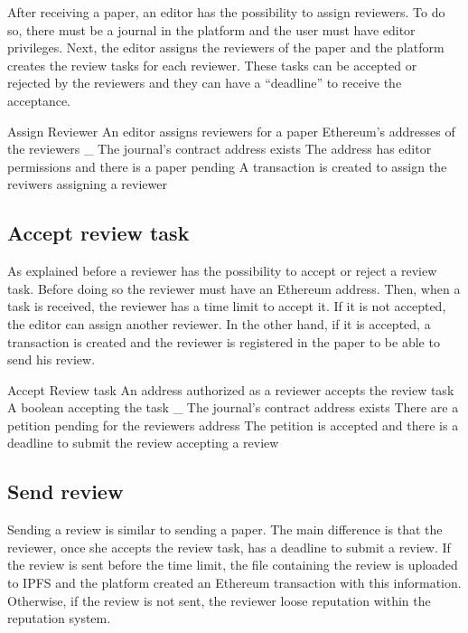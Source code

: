 After receiving a paper, an editor has the possibility to assign reviewers. To
do so, there must be a journal in the platform and the user must have editor
privileges. Next, the editor assigns the reviewers of the paper and the platform
creates the review tasks for each reviewer. These tasks can be accepted or
rejected by the reviewers and they can have a ``deadline'' to receive the
acceptance.

{Assign Reviewer}%
{An editor assigns reviewers for a paper}%
{Ethereum's addresses of the reviewers}%
{_}%
{The journal's contract address exists} {The address has editor permissions and
  there is a paper pending}%
{A transaction is created to assign the reviwers}%
{assigning a reviewer}%

\subsection*{Accept review task}

As explained before a reviewer has the possibility to accept or reject a review
task. Before doing so the reviewer must have an Ethereum address. Then, when a
task is received, the reviewer has a time limit to accept it. If it is not
accepted, the editor can assign another reviewer. In the other hand, if it is
accepted, a transaction is created and the reviewer is registered in the paper
to be able to send his review.

{Accept Review task}%
{An address authorized as a reviewer accepts the review
  task}%
{A boolean accepting the task}%
{_}%
{The journal's contract address exists}%
{There are a petition pending for the reviewers address}%
{The petition is accepted and there is a deadline to submit the
  review}%
{accepting a review}%

\subsection*{Send review}

Sending a review is similar to sending a paper. The main difference is that the
reviewer, once she accepts the review task, has a deadline to submit a review.
If the review is sent before the time limit, the file containing the review is
uploaded to IPFS and the platform created an Ethereum transaction with this
information. Otherwise, if the review is not sent, the reviewer loose reputation
within the reputation system.

